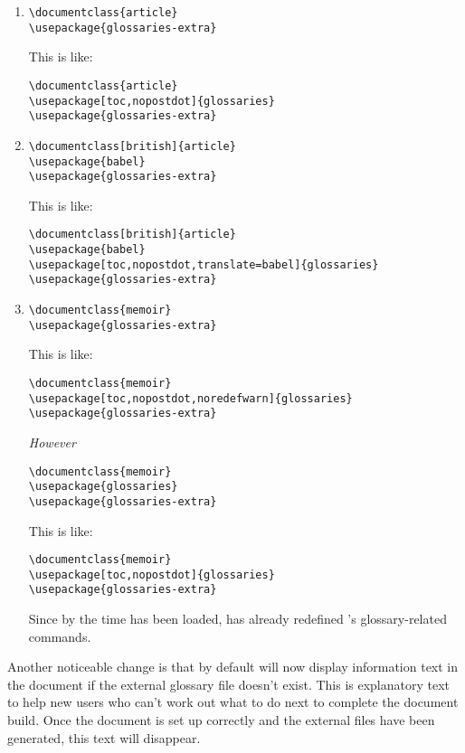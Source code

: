 \documentclass[report,inlinetitle,widecs]{nlctdoc}
\begin{document}
\begin{enumerate}
\item 
\begin{verbatim}
\documentclass{article}
\usepackage{glossaries-extra}
\end{verbatim}
This is like:
\begin{verbatim}
\documentclass{article}
\usepackage[toc,nopostdot]{glossaries}
\usepackage{glossaries-extra}
\end{verbatim}

\item
\begin{verbatim}
\documentclass[british]{article}
\usepackage{babel}
\usepackage{glossaries-extra}
\end{verbatim}
This is like:
\begin{verbatim}
\documentclass[british]{article}
\usepackage{babel}
\usepackage[toc,nopostdot,translate=babel]{glossaries}
\usepackage{glossaries-extra}
\end{verbatim}

\item
\begin{verbatim}
\documentclass{memoir}
\usepackage{glossaries-extra}
\end{verbatim}
This is like:
\begin{verbatim}
\documentclass{memoir}
\usepackage[toc,nopostdot,noredefwarn]{glossaries}
\usepackage{glossaries-extra}
\end{verbatim}
\emph{However}
\begin{verbatim}
\documentclass{memoir}
\usepackage{glossaries}
\usepackage{glossaries-extra}
\end{verbatim}
This is like:
\begin{verbatim}
\documentclass{memoir}
\usepackage[toc,nopostdot]{glossaries}
\usepackage{glossaries-extra}
\end{verbatim}
Since by the time  has been loaded,
 has already redefined 's
glossary-related commands.
\end{enumerate}

Another noticeable change is that by default 
will now display information text in the document if the external
glossary file doesn't exist. This is explanatory text to help new
users who can't work out what to do next to complete the document
build. Once the document is set up correctly and the external files
have been generated, this text will disappear.
\end{document}
